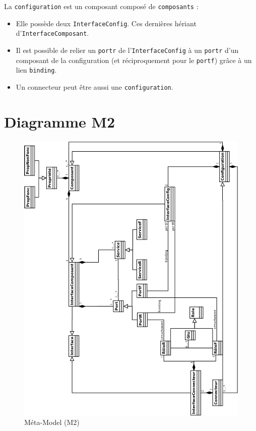 La \verb+configuration+  est un composant composé de \verb+composants+ : 

\begin{itemize}
\item 
  Elle possède deux \verb+InterfaceConfig+. Ces dernières hériant d'\verb+InterfaceComposant+.
\item
  Il est possible de relier un \verb+portr+ de l'\verb+InterfaceConfig+ à un \verb+portr+ d'un composant de la configuration (et réciproquement pour le \verb+portf+) grâce à un lien \verb+binding+.
\item
  Un connecteur peut être aussi une \verb+configuration+.
\end{itemize}
\section{Diagramme M2}
\pagestyle{empty}
\begin{figure}[htb]
  \includegraphics[scale=0.36]{img/M2}
  \caption{Méta-Model (M2)}
  \label{fig:M2}
\end{figure}
